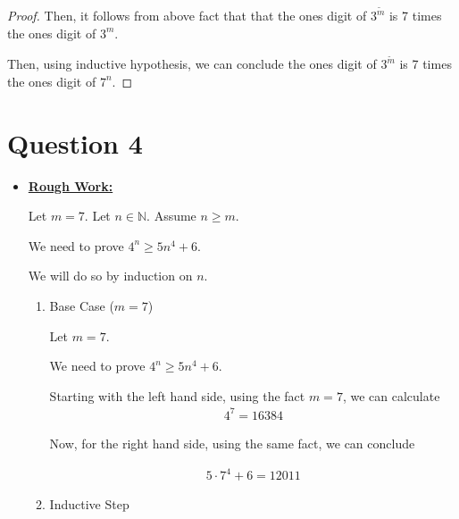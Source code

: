 \documentclass[12pt]{article}
\begin{document}
\begin{itemize}
\begin{mdframed}
\begin{proof}
        \bigskip

        Then, it follows from above fact that that the ones digit of $3^{\tilde{m}}$
        is 7 times the ones digit of $3^m$.

        \bigskip

        Then, using inductive hypothesis, we can conclude the ones digit of $3^{\tilde{m}}$
        is 7 times the ones digit of $7^n$.

        \end{proof}
    \end{mdframed}
\end{itemize}

\section*{Question 4}
\begin{itemize}
    \item

    \begin{mdframed}

        \underline{\textbf{Rough Work:}}

        \bigskip

        Let $m = 7$. Let $n \in \mathbb{N}$. Assume $n \geq m$.

        \bigskip

        We need to prove $4^n \geq 5n^4 + 6$.

        \bigskip

        We will do so by induction on $n$.

        \begin{enumerate}[1.]
            \item Base Case ($m = 7$)

            \begin{mdframed}
            Let $m = 7$.

            \bigskip

            We need to prove $4^n \geq 5n^4 + 6$.

            \bigskip

            Starting with the left hand side, using the fact $m = 7$, we
            can calculate
            \setcounter{equation}{0}
            \begin{align}
                4^7 = 16384
            \end{align}

            \bigskip

            Now, for the right hand side, using the same fact, we can conclude

            \begin{align}
                5 \cdot 7^4 + 6 = 12011
            \end{align}

            \end{mdframed}

            \item Inductive Step
        \end{enumerate}
    \end{mdframed}
\end{itemize}
\end{document}
